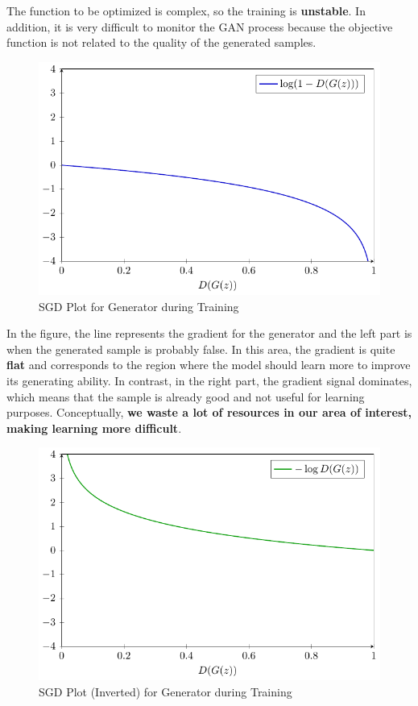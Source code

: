 The function to be optimized is complex, so the training is \textbf{unstable}. In addition, it is very difficult to monitor the GAN process because the objective function is not related to the quality of the generated samples.

\begin{figure}[!htbp]
    \centering
    \includegraphics[width=0.7\linewidth]{tikz/chapter9 - SGD GAN Plot 1.pdf}
    \caption{SGD Plot for Generator during Training}
\end{figure}

In the figure, the line represents the gradient for the generator and the left part is when the generated sample is probably false. In this area, the gradient is quite \textbf{flat} and corresponds to the region where the model should learn more to improve its generating ability. In contrast, in the right part, the gradient signal dominates, which means that the sample is already good and not useful for learning purposes. Conceptually, \textbf{we waste a lot of resources in our area of interest, making learning more difficult}.

\begin{figure}[!htbp]
    \centering
    \includegraphics[width=0.7\linewidth]{tikz/chapter9 - SGD GAN Plot 2.pdf}
    \caption{SGD Plot (Inverted) for Generator during Training}
\end{figure}

